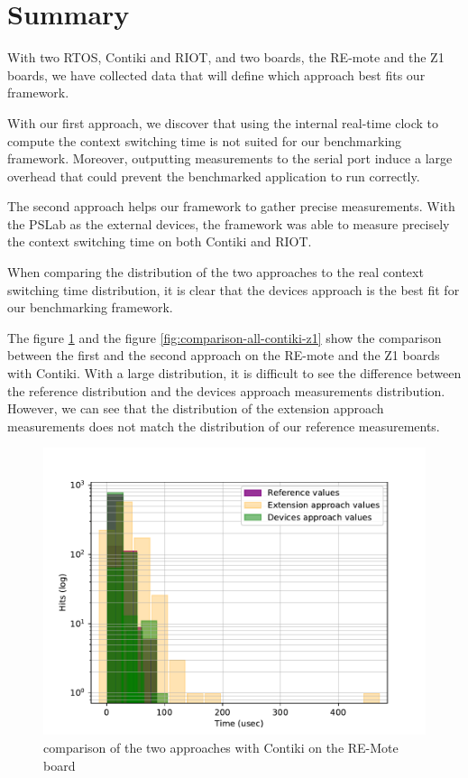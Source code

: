 \section{Summary}

With two RTOS, Contiki and RIOT, and two boards, the RE-mote and the Z1 boards, we have collected data that will define which approach best fits our framework.

With our first approach, we discover that using the internal real-time clock to compute the context switching time is not suited for our benchmarking framework.
Moreover, outputting measurements to the serial port induce a large overhead that could prevent the benchmarked application to run correctly.

The second approach helps our framework to gather precise measurements.
With the PSLab as the external devices, the framework was able to measure precisely the context switching time on both Contiki and RIOT.

When comparing the distribution of the two approaches to the real context switching time distribution, it is clear that the devices approach is the best fit for our benchmarking framework.

The figure \ref{fig:comparison-all-contiki-remote} and the figure \ref{fig:comparison-all-contiki-z1} show the comparison between the first and the second approach on the RE-mote and the Z1 boards with Contiki.
With a large distribution, it is difficult to see the difference between the reference distribution and the devices approach measurements distribution.
However, we can see that the distribution of the extension approach measurements does not match the distribution of our reference measurements.

\begin{figure}[!ht]
  \centering
  \includegraphics[scale=.7]{assets/comparison-all-contiki-remote.pdf}
  \caption{comparison of the two approaches with Contiki on the RE-Mote board\label{fig:comparison-all-contiki-remote}}
\end{figure}

